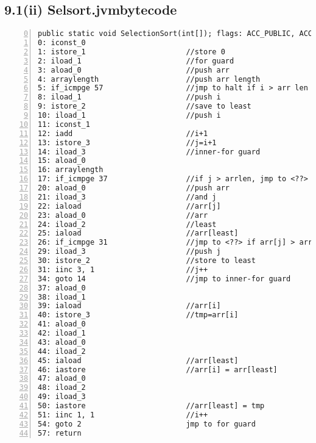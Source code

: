 \documentclass[a4paper, titlepage]{article}
\begin{document}
\subsection*{9.1(ii) Selsort.jvmbytecode}
\begin{lstlisting}[numbers=left, firstnumber=0, title=Selsort.jvmbytecode]
  public static void SelectionSort(int[]); flags: ACC_PUBLIC, ACC_STATIC Code: stack=4, locals=4, args_size=1
0: iconst_0
1: istore_1                       //store 0
2: iload_1                        //for guard
3: aload_0                        //push arr
4: arraylength                    //push arr length
5: if_icmpge 57                   //jmp to halt if i > arr len
8: iload_1                        //push i
9: istore_2                       //save to least
10: iload_1                       //push i
11: iconst_1
12: iadd                          //i+1
13: istore_3                      //j=i+1
14: iload_3                       //inner-for guard
15: aload_0
16: arraylength
17: if_icmpge 37                  //if j > arrlen, jmp to <??>
20: aload_0                       //push arr
21: iload_3                       //and j
22: iaload                        //arr[j]
23: aload_0                       //arr
24: iload_2                       //least
25: iaload                        //arr[least]
26: if_icmpge 31                  //jmp to <??> if arr[j] > arr[least]
29: iload_3                       //push j       
30: istore_2                      //store to least
31: iinc 3, 1                     //j++
34: goto 14                       //jmp to inner-for guard
37: aload_0
38: iload_1
39: iaload                        //arr[i]
40: istore_3                      //tmp=arr[i]
41: aload_0
42: iload_1
43: aload_0
44: iload_2
45: iaload                        //arr[least]
46: iastore                       //arr[i] = arr[least]
47: aload_0
48: iload_2
49: iload_3
50: iastore                       //arr[least] = tmp
51: iinc 1, 1                     //i++
54: goto 2                        jmp to for guard
57: return
\end{lstlisting}
\end{document}
